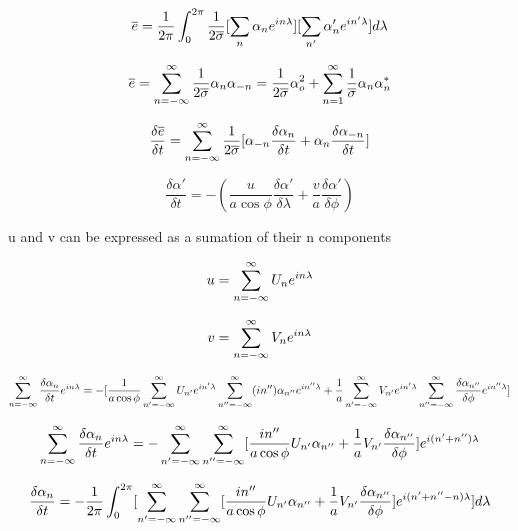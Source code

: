 \documentclass{article}
\begin{document}
\begin{equation}
\overline{e} = \frac{1}{2\pi} \int_{0}^{2\pi} \frac{1}{2\overline{\sigma}} [\sum_{n} \alpha_n e^{in\lambda} ][\sum_{n'} \alpha_n' e^{in'\lambda} ] d\lambda
\end{equation}

\begin{equation}
\overline{e} = \sum_{n=-\infty}^{\infty} \frac{1}{2\overline{\sigma}} \alpha_n\alpha_{-n} = \frac{1}{2\overline{\sigma}} \alpha_{o}^2 + \sum_{n=1}^{\infty} \frac{1}{\overline{\sigma}} \alpha_n\alpha_{n}^{*}
\end{equation}


\begin{equation}
\frac{\delta \overline{e}}{\delta t} = \sum_{n=-\infty}^{\infty} \frac{1}{2\overline{\sigma}} [ \alpha_{-n} \frac{\delta \alpha_n}{\delta t} + \alpha_n \frac{\delta \alpha_{-n}}{\delta t} ]
\end{equation}

\begin{equation}
\frac{\delta \alpha'}{\delta t} = - (\frac{u}{a \cos{\phi}} \frac{\delta \alpha'}{\delta \lambda} + \frac{v}{a}\frac{\delta \alpha'}{\delta \phi} )
\end{equation}

u and v can be expressed as a sumation of their n components

\begin{equation}
u = \sum_{n=-\infty}^{\infty} U_n e^{in\lambda}
\end{equation}

\begin{equation}
v = \sum_{n=-\infty}^{\infty} V_n e^{in\lambda}
\end{equation}


\begin{equation}
\sum_{n=-\infty}^{\infty} \frac{\delta \alpha_n}{\delta t} e^{in\lambda} = - [ \frac{1}{a\cos{\phi}} \sum_{n'=-\infty}^{\infty} U_{n'} e^{in'\lambda} \sum_{n''=-\infty}^{\infty} (in'') \alpha_{n''} e^{in''\lambda} + \frac{1}{a} \sum_{n'=-\infty}^{\infty} V_{n'} e^{in'\lambda} \sum_{n''=-\infty}^{\infty} \frac{\delta \alpha_{n''}}{\delta \phi} e^{in''\lambda} ]
\end{equation}

\begin{equation}
\sum_{n=-\infty}^{\infty} \frac{\delta \alpha_n}{\delta t} e^{in\lambda} = - \sum_{n'=-\infty}^{\infty} \sum_{n''=-\infty}^{\infty} [ \frac{in''}{a \cos{\phi}} U_{n'} \alpha_{n''} + \frac{1}{a} V_{n'} \frac{\delta \alpha_{n''}}{\delta \phi} ] e^{i(n'+n'')\lambda}
\end{equation}

\begin{equation}
\frac{\delta \alpha_n}{\delta t} = - \frac{1}{2\pi} \int_{0}^{2\pi} [ \sum_{n'=-\infty}^{\infty} \sum_{n''=-\infty}^{\infty} [ \frac{in''}{a \cos{\phi}} U_{n'} \alpha_{n''} + \frac{1}{a} V_{n'} \frac{\delta \alpha_{n''}}{\delta \phi} ] e^{i(n'+n''-n)\lambda} ] d\lambda
\label{dandt}
\end{equation}
\end{document}
